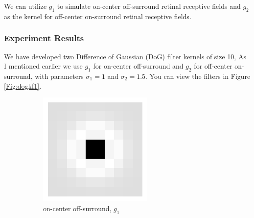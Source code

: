 \documentclass[12pt]{article}
\begin{document}
We can utilize $g_1$ to simulate on-center off-surround retinal receptive fields and $g_2$ as the kernel for off-center on-surround retinal receptive fields.
	
	\subsubsection{Experiment Results}
	
	We have developed two Difference of Gaussian (DoG) filter kernels of size 10, As I mentioned earlier we use $g_1$ for on-center off-surround and $g_2$
for off-center on-surround, with parameters $\sigma_1 = 1$ and $\sigma_2 = 1.5$. You can view the filters in Figure \ref{Fig:dogkf1}.
	
\begin{figure}[H]
\centering
	\begin{subfigure}[b]{0.22\textwidth}
    \includegraphics[width=\textwidth]{Figs/kf2.png}
    \caption{on-center off-surround, $g_1$}
  \end{subfigure}
  \hspace{80}
  \begin{subfigure}[b]{0.22\textwidth}

\end{subfigure}
\end{figure}
\end{document}
